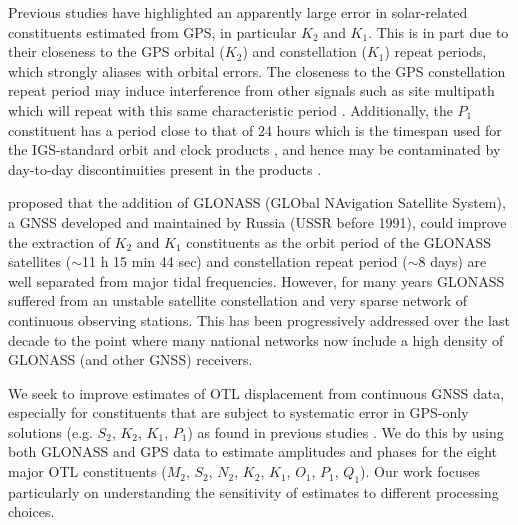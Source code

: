 \documentclass[se, manuscript]{copernicus}
\begin{document}
Previous studies have highlighted an apparently large error in solar-related constituents estimated from GPS, in particular $K_2$ and $K_1$. This is in part due to their closeness to the GPS orbital ($K_2$) and constellation ($K_1$) repeat periods, which strongly aliases with orbital errors. The closeness to the GPS constellation repeat period may induce interference from other signals such as site multipath which will repeat with this same characteristic period \citep{Schenewerk2001,Urschl2005,Thomas2006}. Additionally, the $P_1$ constituent has a period close to that of 24 hours which is the timespan used for the IGS-standard orbit and clock products \citep{Griffiths2009}, and hence may be contaminated by day-to-day discontinuities present in the products \citep{Ito2011}.

\cite{Urschl2005} proposed that the addition of GLONASS (GLObal NAvigation Satellite System), a GNSS developed and maintained by Russia (USSR before 1991), could improve the extraction of $K_2$ and $K_1$ constituents as the orbit period of the GLONASS satellites ($\sim$11 h 15 min 44 sec) and constellation repeat period ($\sim$8 days) are well separated from major tidal frequencies. However, for many years GLONASS suffered from an unstable satellite constellation and very sparse network of continuous observing stations. This has been progressively addressed over the last decade to the point where many national networks now include a high density of GLONASS (and other GNSS) receivers.

We seek to improve estimates of OTL displacement from continuous GNSS data, especially for constituents that are subject to systematic error in GPS-only solutions (e.g. $S_2$, $K_2$, $K_1$, $P_1$) as found in previous studies \citep{Allinson2004,King2006,Yuan2012}. We do this by using both GLONASS and GPS data to estimate amplitudes and phases for the eight major OTL constituents ($M_2$, $S_2$, $N_2$, $K_2$, $K_1$, $O_1$, $P_1$, $Q_1$). Our work focuses particularly on understanding the sensitivity of estimates to different processing choices.
\end{document}
